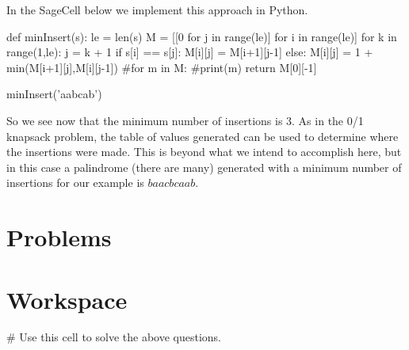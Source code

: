 \documentclass{ximera}
\begin{document}
In the SageCell below we implement this approach in Python.

\begin{sageCell}
def minInsert(s):
        le = len(s)
        M = [[0 for j in range(le)] for i in range(le)]
	for k in range(1,le):
                j = k + 1
                if s[i] == s[j]:
                        M[i][j] = M[i+1][j-1]
                else:
                        M[i][j] = 1 + min(M[i+1][j],M[i][j-1])
        #for m in M:
                #print(m)
        return M[0][-1]

minInsert('aabcab')
\end{sageCell}

So we see now that the minimum number of insertions is 3. As in the 0/1 knapsack problem, the table of values generated can be used to determine where the insertions were made. This is beyond what we intend to accomplish here, but in this case a palindrome (there are many) generated with a minimum number of insertions for our example is $baacbcaab$.

\section{Problems}


\begin{question}
\end{question}

\section{Workspace}

\begin{sageCell}
# Use this cell to solve the above questions.
\end{sageCell}
\end{document}
